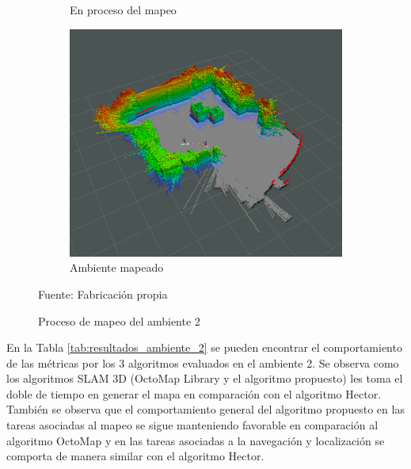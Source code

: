 \begin{figure}[H]
\begin{subfigure}[b]{0.30\textwidth}
    \caption{En proceso del mapeo}
    \label{fig:ambiente_2_2}
    \end{subfigure}
    \begin{subfigure}[b]{0.30\textwidth}
    \includegraphics[width=\textwidth, height=\textwidth]{figures/05experimentacion/ambiente_2/r01_03.png}
    \caption{Ambiente mapeado}
    \label{fig:ambiente_2_3}
    \end{subfigure}
    \caption{Proceso de mapeo del ambiente 2}
    Fuente: Fabricación propia
    \label{fig:ambiente_2}
\end{figure} 

En la Tabla \ref{tab:resultados_ambiente_2} se pueden encontrar el comportamiento de las métricas por los 3 algoritmos evaluados en el ambiente 2. Se observa como los algoritmos SLAM 3D (OctoMap Library y el algoritmo propuesto) les toma el doble de tiempo en generar el mapa en comparación con el algoritmo Hector. También se observa que el comportamiento general del algoritmo propuesto en las tareas asociadas al mapeo se sigue manteniendo favorable en comparación al algoritmo OctoMap y en las tareas asociadas a la navegación y localización se comporta de manera similar con el algoritmo Hector.

